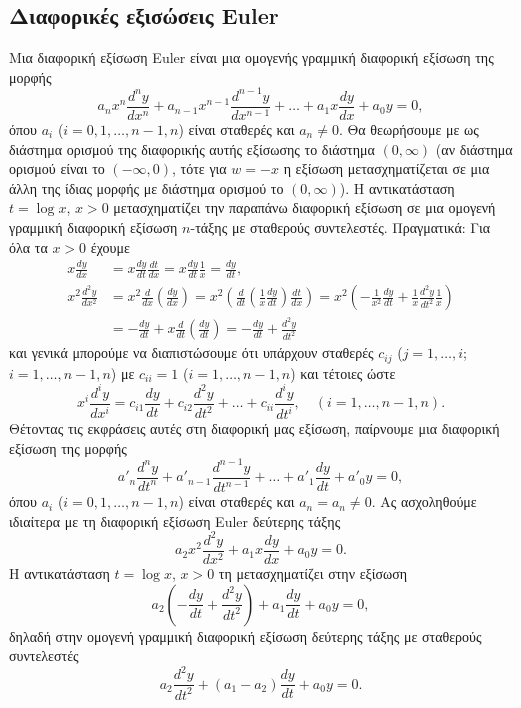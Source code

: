 \documentclass[11pt,a4paper,twoside]{book}
\newcommand{\eng}[1]{\selectlanguage{english}#1\selectlanguage{greek}}
\begin{document}
\subsection{Διαφορικές εξισώσεις Euler}
Μια διαφορική εξίσωση Euler είναι μια ομογενής γραμμική διαφορική εξίσωση της μορφής
\[
    a_n x^n \frac{d^n y}{dx^n} + a_{n-1} x^{n-1} \frac{d^{n-1}y}{dx^{n-1}} + \dots + a_1 x \frac{dy}{dx} + a_0 y = 0,
\]
όπου $a_i$ ($i=0,1,\dots,n-1,n$) είναι σταθερές και $a_n\neq 0$. Θα θεωρήσουμε με ως διάστημα ορισμού της διαφορικής αυτής εξίσωσης το διάστημα $(0,\infty)$ (αν διάστημα ορισμού είναι το $(-\infty,0)$, τότε για $w=-x$ η εξίσωση μετασχηματίζεται σε μια άλλη της ίδιας μορφής με διάστημα ορισμού το $(0,\infty)$). Η αντικατάσταση $t=\log x$, $x>0$ μετασχηματίζει την παραπάνω διαφορική εξίσωση σε μια ομογενή γραμμική διαφορική εξίσωση
$n$-τάξης με σταθερούς συντελεστές. Πραγματικά: Για όλα τα $x>0$ έχουμε
\begin{align*}
    x\frac{dy}{dx} &= x\frac{dy}{dt}\frac{dt}{dx} = x\frac{dy}{dt}\frac{1}{x} = \frac{dy}{dt}, \\
    x^2\frac{d^2y}{dx^2} &= x^2\frac{d}{dx}\left(\frac{dy}{dx}\right) = x^2\left(\frac{d}{dt}\left(\frac{1}{x}\frac{dy}{dt}\right)\frac{dt}{dx}\right) = x^2\left(-\frac{1}{x^2}\frac{dy}{dt}+\frac{1}{x}\frac{d^2y}{dt^2}\frac{1}{x}\right) \\
    &= -\frac{dy}{dt}+x\frac{d}{dt}\left(\frac{dy}{dt}\right) = -\frac{dy}{dt}+\frac{d^2y}{dt^2}
\end{align*}
και γενικά μπορούμε να διαπιστώσουμε ότι υπάρχουν σταθερές $c_{ij}$ ($j=1,\dots,i$; $i=1,\dots,n-1,n$) με $c_{ii}=1$ ($i=1,\dots,n-1,n$) και τέτοιες ώστε
\[
    x^i\frac{d^iy}{dx^i} = c_{i1}\frac{dy}{dt}+c_{i2}\frac{d^2y}{dt^2}+\dots+c_{ii}\frac{d^iy}{dt^i}, \quad (i=1,\dots,n-1,n).
\]
Θέτοντας τις εκφράσεις αυτές στη διαφορική μας εξίσωση, παίρνουμε μια διαφορική εξίσωση της μορφής
\[
    a'_n\frac{d^ny}{dt^n}+a'_{n-1}\frac{d^{n-1}y}{dt^{n-1}}+\dots+a'_1\frac{dy}{dt}+a'_0y=0,
\]
όπου $a_i$ ($i=0,1,\dots,n-1,n$) είναι σταθερές και $a_n=a_n\neq 0$.
Ας ασχοληθούμε ιδιαίτερα με τη διαφορική εξίσωση \eng{Euler} δεύτερης τάξης
\[
    a_2 x^2 \frac{d^2y}{dx^2} + a_1 x \frac{dy}{dx} + a_0 y = 0.
\]
Η αντικατάσταση $t=\log x$, $x>0$ τη μετασχηματίζει στην εξίσωση
\[
    a_2\left(-\frac{dy}{dt}+\frac{d^2y}{dt^2}\right)+a_1\frac{dy}{dt}+a_0 y=0,
\]
δηλαδή στην ομογενή γραμμική διαφορική εξίσωση δεύτερης τάξης με σταθερούς συντελεστές
\[
    a_2\frac{d^2y}{dt^2}+(a_1-a_2)\frac{dy}{dt}+a_0 y=0.
\]
\end{document}
